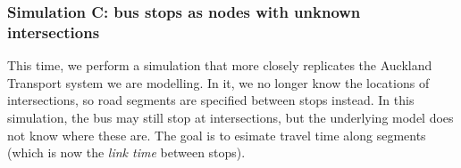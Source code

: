 \subsubsection{Simulation C: bus stops as nodes with unknown intersections}
\label{sec:vehicle_sim_C}

This time, we perform a simulation that more closely replicates the Auckland Transport system we are modelling. In it, we no longer know the locations of intersections, so road segments are specified between stops instead. In this simulation, the bus may still stop at intersections, but the underlying model does not know where these are. The goal is to esimate travel time along segments (which is now the \emph{link time} between stops).
